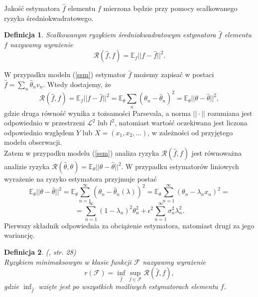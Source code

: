 \documentclass{mwart}
\newtheorem{df}{Definicja}
\begin{document}
Jakość estymatora $\hat{f}$ elementu $f$ mierzona będzie przy pomocy scałkowanego ryzyka średniokwadratowego.
\begin{df}
Scałkowanym ryzykiem średniokwadratowym estymatora $\hat{f}$ elementu $f$ nazywamy wyrażenie
\begin{displaymath}
\mathcal{R}(\hat{f},f)=\mathbb{E}_f||f-\hat{f}||^2.
\end{displaymath}
\end{df}
W przypadku modelu (\ref{ssm}) estymator $\hat{f}$ możemy zapisać w postaci $\hat{f}=\sum_n\hat{\theta}_nv_n$. Wtedy dostajemy, że 
\begin{displaymath}
\mathcal{R}(\hat{f},f)=\mathbb{E}_f||f-\hat{f}||^2=\mathbb{E}_{\theta}\sum_n\left(\theta_n-\hat{\theta}_n\right)^2=\mathbb{E}_{\theta}||\theta-\hat{\theta}||^2,
\end{displaymath}
gdzie druga równość wynika z tożsamości Parsevala, a norma $||\cdot ||$ rozumiana jest odpowiednio w przestrzeni $\mathcal{L}^2$ lub $l^2$, natomiast wartość oczekiwana jest liczona odpowiednio względem $Y$ lub $X=(x_1,x_2,\dots)$, w zależności od przyjętego modelu obserwacji.\\
Zatem w przypadku modelu (\ref{ssm}) analiza ryzyka $\mathcal{R}(\hat{f},f)$ jest równoważna analizie ryzyka $\mathcal{R}(\hat{\theta},\theta)=\mathbb{E}_{\theta}||\theta-\hat{\theta}||^2$. W przypadku estymatorów liniowych wyrażenie na ryzyko estymatora przyjmuje postać 
\begin{displaymath}
\mathbb{E}_{\theta}||\theta-\hat{\theta}||^2=\mathbb{E}_{\theta}\sum_{n=1}^{\infty}\left(\theta_n-\hat{\theta}_n(\lambda)\right)^2=\mathbb{E}_{\theta}\sum_{n=1}^{\infty}\left(\theta_n-\lambda_nx_n\right)^2=
\end{displaymath}
\begin{equation}\label{risk}
=\sum_{n=1}^{\infty}(1-\lambda_n)^2\theta_n^2+\epsilon^2\sum_{n=1}^{\infty}\sigma_n^2\lambda_n^2.
\end{equation}
Pierwszy składnik odpowiednia za obciążenie estymatora, natomiast drugi za jego wariancję.\\
\begin{df}(\cite{iphde}, str. 28)\\
Ryzykiem minimaksowym w klasie funkcji $\mathcal{F}$ nazywamy wyrażenie 
\begin{displaymath}
r(\mathcal{F})=\inf_{\hat{f}}\sup_{f\in \mathcal{F}}\mathcal{R}(\hat{f},f),
\end{displaymath}
gdzie $\inf_{\hat{f}}$ wzięte jest po wszystkich możliwych estymatorach elementu $f$.
\end{df}
\end{document}
